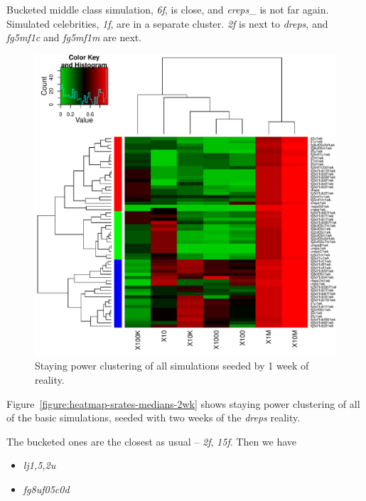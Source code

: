 \documentclass[10pt,oneside]{memoir}
\begin{document}
\begin{Spacing}{2}
Bucketed middle class simulation, {\itshape 6f}, is close, and {\itshape ereps}\_ is not far again.  Simulated celebrities, {\itshape 1f}, are in a separate cluster.  {\itshape 2f} is next to {\itshape dreps}, and {\itshape fg5mf1c} and {\itshape fg5mf1m} are next.



\begin{figure}
\begin{center}
    \includegraphics{figures/heatmap-srates-medians-1wk}
    \caption{Staying power clustering of all simulations seeded by 1 week of reality.}
    \label{figure:heatmap-srates-medians-1wk}
\end{center}
\end{figure}
Figure~\ref{figure:heatmap-srates-medians-2wk} shows staying power clustering of all of the basic simulations, seeded with two weeks of the {\itshape dreps} reality.


The bucketed ones are the closest as usual -- {\itshape 2f}, {\itshape 15f}.  Then we have 


\begin{itemize}


\item {\itshape lj{1,5,2}u}

\item {\itshape fg8uf05c0d}



\end{itemize}
\end{Spacing}
\end{document}
